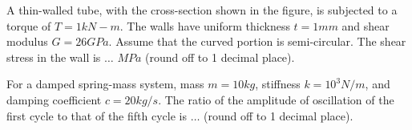     \item A thin-walled tube, with the cross-section shown in the figure, is subjected to a torque of $T=1 kN-m$. The walls have uniform thickness $t = 1 mm$ and shear modulus $G = 26 GPa$. Assume that the curved portion is semi-circular. The shear stress in the wall is $\dots$ $MPa$ (round off to 1 decimal place).

    \begin{figure}[H]
\centering
{}%

\label{fig:my_label}
\end{figure}

    \item For a damped spring-mass system, mass $m = 10 kg$, stiffness $k = 10^3 N/m$, and damping coefficient $c = 20 kg/s$. The ratio of the amplitude of oscillation of the first cycle to that of the fifth cycle is $\dots$ (round off to 1 decimal place).

